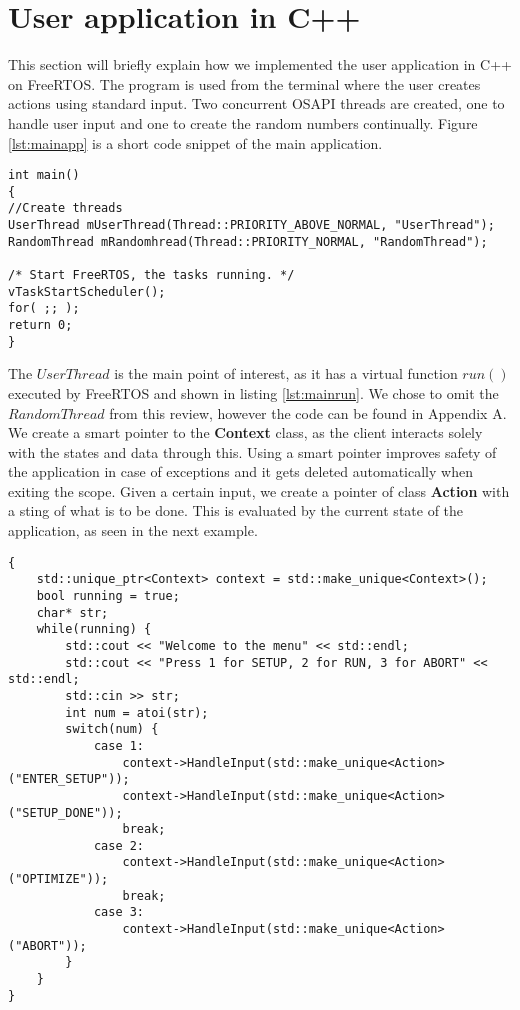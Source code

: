 \section{User application in C++}

This section will briefly explain how we implemented the user application in C++ on FreeRTOS. The program is used from the terminal where the user creates actions using standard input. Two concurrent OSAPI threads are created, one to handle user input and one to create the random numbers continually. Figure \ref{lst:mainapp} is a short code snippet of the main application.

\begin{lstlisting}[style=customc++,caption={Main application, where two threads are created and the scheduler started.},label={lst:mainapp}]
int main()
{
//Create threads
UserThread mUserThread(Thread::PRIORITY_ABOVE_NORMAL, "UserThread");
RandomThread mRandomhread(Thread::PRIORITY_NORMAL, "RandomThread");

/* Start FreeRTOS, the tasks running. */
vTaskStartScheduler();
for( ;; );
return 0;
}
\end{lstlisting}

The $UserThread$ is the main point of interest, as it has a virtual function $run()$ executed by FreeRTOS and shown in listing \ref{lst:mainrun}. We chose to omit the $RandomThread$ from this review, however the code can be found in Appendix A. We create a smart pointer to the \textbf{Context} class, as the client interacts solely with the states and data through this. Using a smart pointer improves safety of the application in case of exceptions and it gets deleted automatically when exiting the scope. Given a certain input, we create a pointer of class \textbf{Action} with a sting of what is to be done. This is evaluated by the current state of the application, as seen in the next example.

\begin{lstlisting}[style=customc++,caption={Main application, where two threads are created with a scheduler.},label={lst:mainrun}]
{
	std::unique_ptr<Context> context = std::make_unique<Context>();
	bool running = true;
	char* str;
	while(running) {
		std::cout << "Welcome to the menu" << std::endl;
		std::cout << "Press 1 for SETUP, 2 for RUN, 3 for ABORT" << std::endl;
		std::cin >> str;
		int num = atoi(str);
		switch(num) {
			case 1:
				context->HandleInput(std::make_unique<Action>("ENTER_SETUP"));
				context->HandleInput(std::make_unique<Action>("SETUP_DONE"));
				break;
			case 2:
				context->HandleInput(std::make_unique<Action>("OPTIMIZE"));
				break;
			case 3:
				context->HandleInput(std::make_unique<Action>("ABORT"));
		}
	}
}
\end{lstlisting}

